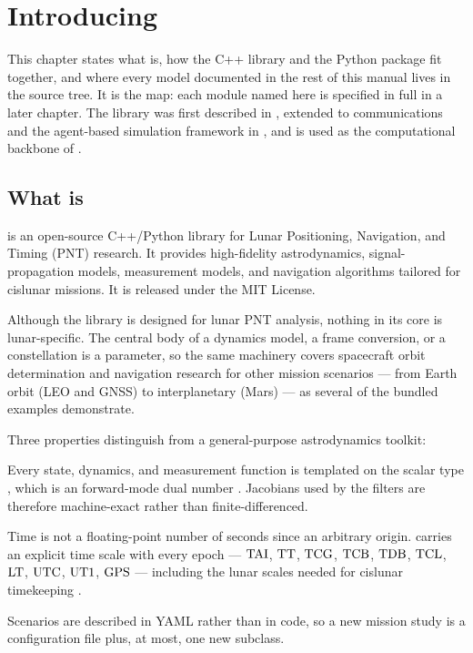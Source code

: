 \chapter{Introducing \lupnt{}}
\label{chap:introduction}

This chapter states what \lupnt{} is, how the C++ library and the \pylupnt{}
Python package fit together, and where every model documented in the rest of
this manual lives in the source tree. It is the map: each module named here is
specified in full in a later chapter. The library was first described in
\citep{iiyama2023lupnt}, extended to communications and the agent-based
simulation framework in \citep{casadesus2025lupnt}, and is used as the
computational backbone of \citep{iiyama2026thesis}.

\section{What \lupnt{} is}
\label{sec:intro-what}

\lupnt{} is an open-source C++/Python library for Lunar Positioning,
Navigation, and Timing (PNT) research. It provides high-fidelity
astrodynamics, signal-propagation models, measurement models, and navigation
algorithms tailored for cislunar missions. It is released under the MIT
License.

Although the library is designed for lunar PNT analysis, nothing in its core is
lunar-specific. The central body of a dynamics model, a frame conversion, or a
constellation is a parameter, so the same machinery covers spacecraft orbit
determination and navigation research for other mission scenarios --- from
Earth orbit (LEO and GNSS) to interplanetary (Mars) --- as several of the
bundled examples demonstrate.

Three properties distinguish \lupnt{} from a general-purpose astrodynamics
toolkit:

\begin{description}[leftmargin=1.2cm,style=nextline,font=\normalfont\itshape]
  \item[Differentiable by construction] Every state, dynamics, and measurement
    function is templated on the scalar type , which is an
     forward-mode dual number \citep{leal2018autodiff,
    griewank2008}. Jacobians used by the filters are therefore machine-exact
    rather than finite-differenced.
  \item[Relativistically explicit] Time is not a floating-point number of
    seconds since an arbitrary origin. \lupnt{} carries an explicit time scale
    with every epoch --- $\mathrm{TAI}$, $\mathrm{TT}$, $\mathrm{TCG}$, $\mathrm{TCB}$, $\mathrm{TDB}$, $\mathrm{TCL}$, $\mathrm{LT}$,
    $\mathrm{UTC}$, $\mathrm{UT1}$, $\mathrm{GPS}$ --- including the lunar scales needed for
    cislunar timekeeping \citep{turyshev2025transformations,
    turyshev2026cislunar}.
  \item[Config-driven] Scenarios are described in YAML rather than in code, so
    a new mission study is a configuration file plus, at most, one new
     subclass.
\end{description}

